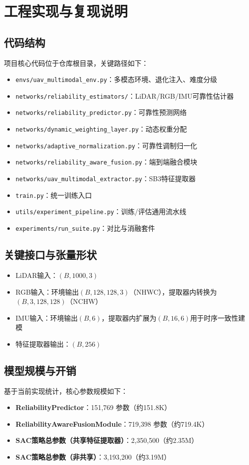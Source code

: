 \chapter{工程实现与复现说明}

\section{代码结构}
项目核心代码位于仓库根目录，关键路径如下：
\begin{itemize}
    \item \texttt{envs/uav\_multimodal\_env.py}：多模态环境、退化注入、难度分级
    \item \texttt{networks/reliability\_estimators/}：LiDAR/RGB/IMU可靠性估计器
    \item \texttt{networks/reliability\_predictor.py}：可靠性预测网络
    \item \texttt{networks/dynamic\_weighting\_layer.py}：动态权重分配
    \item \texttt{networks/adaptive\_normalization.py}：可靠性调制归一化
    \item \texttt{networks/reliability\_aware\_fusion.py}：端到端融合模块
    \item \texttt{networks/uav\_multimodal\_extractor.py}：SB3特征提取器
    \item \texttt{train.py}：统一训练入口
    \item \texttt{utils/experiment\_pipeline.py}：训练/评估通用流水线
    \item \texttt{experiments/run\_suite.py}：对比与消融套件
\end{itemize}

\section{关键接口与张量形状}
\begin{itemize}
    \item LiDAR输入：$(B,1000,3)$
    \item RGB输入：环境输出$(B,128,128,3)$（NHWC），提取器内转换为$(B,3,128,128)$（NCHW）
    \item IMU输入：环境输出$(B,6)$，提取器内扩展为$(B,16,6)$用于时序一致性建模
    \item 特征提取器输出：$(B,256)$
\end{itemize}

\section{模型规模与开销}
基于当前实现统计，核心参数规模如下：
\begin{itemize}
    \item \textbf{ReliabilityPredictor}：151,769 参数（约151.8K）
    \item \textbf{ReliabilityAwareFusionModule}：719,398 参数（约719.4K）
    \item \textbf{SAC策略总参数（共享特征提取器）}：2,350,500（约2.35M）
    \item \textbf{SAC策略总参数（非共享）}：3,193,200（约3.19M）
\end{itemize}

